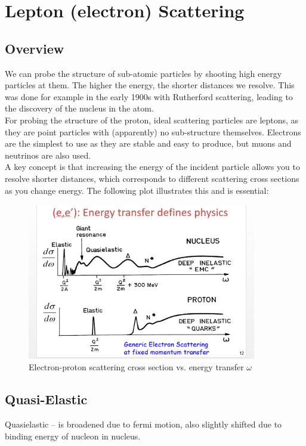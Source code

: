 \chapter{Lepton (electron) Scattering}
    \section{Overview}
        We can probe the structure of sub-atomic particles by shooting high energy particles at them. The higher the energy, the shorter distances we resolve. This was done for example in the early 1900s with Rutherford scattering, leading to the discovery of the nucleus in the atom.\\
        \indent For probing the structure of the proton, ideal scattering particles are leptons, as they are point particles with (apparently) no sub-structure themselves. Electrons are the simplest to use as they are stable and easy to produce, but muons and neutrinos are also used.\\
        \indent A key concept is that increasing the energy of the incident particle allows you to resolve shorter distances, which corresponds to different scattering cross sections as you change energy. The following plot illustrates this and is essential:\\
    
        \begin{figure}[H]
            \centering
            \includegraphics[width=10cm]{NuclearPhysics/modules/lepton-scattering/pics/e-p-scattering.png}
            \caption{Electron-proton scattering cross section vs. energy transfer $\omega$}
        \end{figure}
    \section{Quasi-Elastic}
        Quasielastic – is broadened due to fermi motion, also slightly shifted due to binding energy of nucleon in nucleus.
